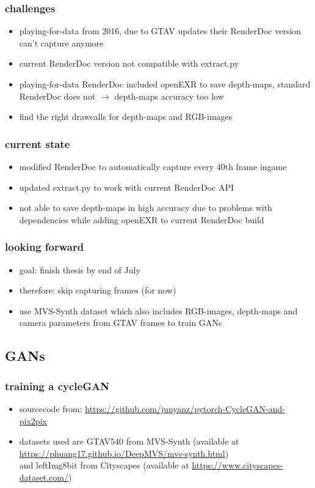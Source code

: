 \documentclass{beamer}
\begin{document}
\begin{frame}
	\frametitle{challenges}
	\begin{itemize}
		\item playing-for-data from 2016, due to GTAV updates their RenderDoc version can't capture anymore
		\item current RenderDoc version not compatible with extract.py
		\item playing-for-data RenderDoc included openEXR to save depth-maps, standard RenderDoc does not $\rightarrow$ depth-maps accuracy too low
		\item find the right drawcalls for depth-maps and RGB-images
	\end{itemize}
\end{frame}

\begin{frame}
	\frametitle{current state}
	\begin{itemize}
		\item modified RenderDoc to automatically capture every 40th frame ingame
		\item updated extract.py to work with current RenderDoc API
		\item not able to save depth-maps in high accuracy due to problems with dependencies while adding openEXR to current RenderDoc build
	\end{itemize}
\end{frame}

\begin{frame}
	\frametitle{looking forward}
	\begin{itemize}
		\item goal: finish thesis by end of July
		\item therefore: skip capturing frames (for now)
		\item use MVS-Synth dataset which also includes RGB-images, depth-maps and camera parameters from GTAV frames to train GANs
	\end{itemize}
\end{frame}


\subsection{GANs}

\begin{frame}
	\frametitle{training a cycleGAN}
	\begin{itemize}
		\item sourcecode from: \href{https://github.com/junyanz/pytorch-CycleGAN-and-pix2pix}{https://github.com/junyanz/pytorch-CycleGAN-and-pix2pix}
		\item datasets used are GTAV540 from MVS-Synth (available at \href{https://phuang17.github.io/DeepMVS/mvs-synth.html}{https://phuang17.github.io/DeepMVS/mvs-synth.html})
		\\
		and leftImg8bit from Cityscapes (available at \href{https://www.cityscapes-dataset.com/}{https://www.cityscapes-dataset.com/})
	\end{itemize}
\end{frame}
\end{document}

